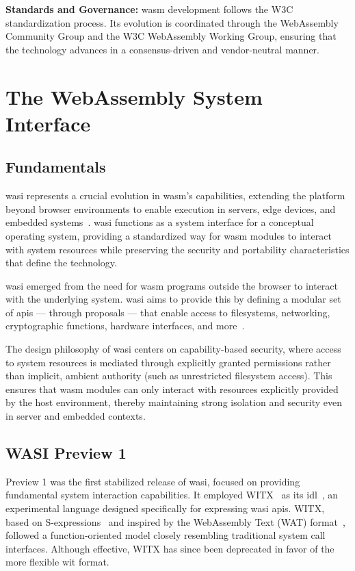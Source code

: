 \textbf{Standards and Governance:} \acrshort{wasm} development follows the W3C standardization process. Its evolution is coordinated through the WebAssembly Community Group and the W3C WebAssembly Working Group, ensuring that the technology advances in a consensus-driven and vendor-neutral manner.

\section{The WebAssembly System Interface}
\label{sec:wasi}

\subsection{Fundamentals}
\label{subsec:wasi-fundamentals}

\acrfull{wasi} represents a crucial evolution in \acrshort{wasm}'s capabilities, extending the platform beyond browser environments to enable execution in servers, edge devices, and embedded systems~\cite{wasi_mozilla_blog}. \acrshort{wasi} functions as a system interface for a conceptual operating system, providing a standardized way for \acrshort{wasm} modules to interact with system resources while preserving the security and portability characteristics that define the technology.

\acrshort{wasi} emerged from the need for \acrshort{wasm} programs outside the browser to interact with the underlying system. \acrshort{wasi} aims to provide this by defining a modular set of \acrshort{api}s --- through proposals --- that enable access to filesystems, networking, cryptographic functions, hardware interfaces, and more~\cite{wasi_proposals}.

The design philosophy of \acrshort{wasi} centers on capability-based security, where access to system resources is mediated through explicitly granted permissions rather than implicit, ambient authority (such as unrestricted filesystem access). This ensures that \acrshort{wasm} modules can only interact with resources explicitly provided by the host environment, thereby maintaining strong isolation and security even in server and embedded contexts.

\subsection{WASI Preview 1}
\label{subsec:wasi-preview1}
Preview 1 was the first stabilized release of \acrfull{wasi}, focused on providing fundamental system interaction capabilities. It employed WITX~\cite{witx_docs} as its \acrfull{idl}~\cite{idl}, an experimental language designed specifically for expressing \acrshort{wasi} \acrshort{api}s. WITX, based on S-expressions~\cite{sexpressions} and inspired by the WebAssembly Text (WAT) format~\cite{wat}, followed a function-oriented model closely resembling traditional system call interfaces. Although effective, WITX has since been deprecated in favor of the more flexible \acrshort{wit} format.

